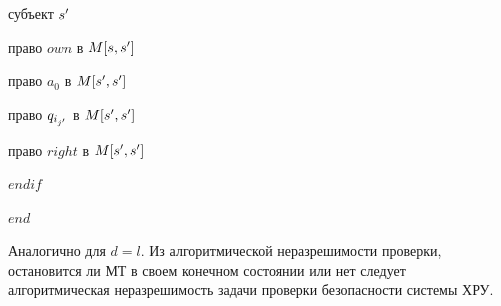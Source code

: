 \begin{proofs}
\begin{dokvo}
\begin{multicols}{2}
\begin{itemize}
					 субъект $s^{\prime}$

					 право $own$ в $M[s,s^{\prime}]$

					 право $a_0$ в $M[s^{\prime},s^{\prime}]$

					 право $q_{i_{j^{\prime}}}$ в $M[s^{\prime},s^{\prime}]$

					 право $right$ в $M[s^{\prime},s^{\prime}]$

					$endif$

					$end$
			\end{itemize}
		\end{multicols}




		Аналогично для $d = l$. Из алгоритмической неразрешимости проверки, остановится ли МТ в своем конечном состоянии или нет следует
		алгоритмическая неразрешимость задачи проверки безопасности системы ХРУ.
	\end{dokvo}
\end{proofs}
\newpage
